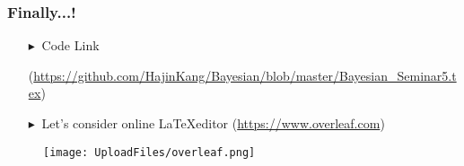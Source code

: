 \documentclass[9pt]{beamer}  %
\newcommand{\bluetri}{\textcolor{Beaverblue}{$\blacktriangleright \ $}}
\begin{document}
\begin{frame}[t]
\frametitle{Finally...!}

\begin{itemize}
   \item[\bluetri] Code Link
    \item[] \hspace{1.23cm} (\href{https://github.com/HajinKang/Bayesian/blob/master/Bayesian_Seminar5.tex}{https://github.com/HajinKang/Bayesian/blob/master/Bayesian\_Seminar5.tex})
   \vspace{0.2cm}
   \item[\bluetri] Let's consider online \LaTeX editor (\href {https://www.overleaf.com}{https://www.overleaf.com})
\end{itemize}

\begin{figure}[h]
	\begin{center}
		\texttt{[image: UploadFiles/overleaf.png]}
	\end{center}
\end{figure}


  \vspace{1cm}

\end{frame}
%
%       






\end{document}
